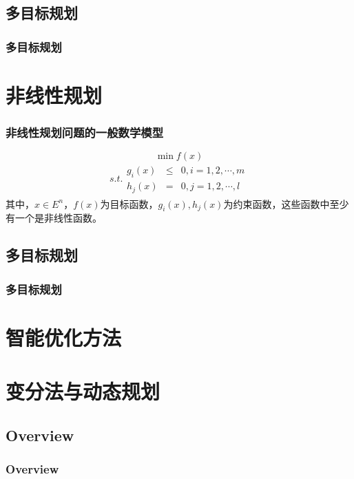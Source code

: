 \documentclass[slidestop,compress,mathserif,c]{beamer}
\begin{document}
\subsection{\hfill 多目标规划}
\begin{frame}
\frametitle{多目标规划}

\end{frame}





\section{非线性规划}
\begin{frame}
\frametitle{非线性规划问题的一般数学模型}
$$\min f(x)$$
\begin{eqnarray*}
  s.t.\begin{array}{ccc}
    g_i(x)&\leq&0,i=1,2,\cdots,m\\
    h_j(x)&=&0,j=1,2,\cdots,l
  \end{array}
\end{eqnarray*}
其中，$x\in E^n$，$f(x)$为目标函数，$g_i(x),h_j(x)$为约束函数，这些函数中至少有一个是非线性函数。

\end{frame}


\subsection{\hfill 多目标规划}
\begin{frame}
\frametitle{多目标规划}


\end{frame}

\section{智能优化方法}
\section{变分法与动态规划}



\subsection{\hfill Overview}
\begin{frame}
\frametitle{Overview}


\end{frame}
\end{document}
